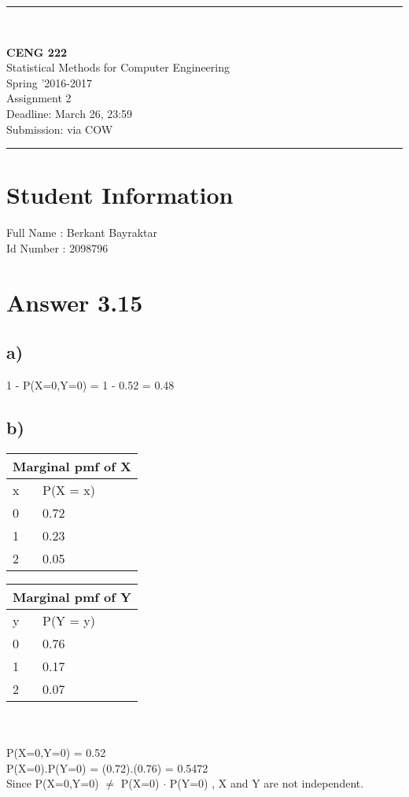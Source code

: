 \documentclass[12pt]{article}
\newcommand{\HRule}{\rule{\linewidth}{1mm}}
\begin{document}
\noindent
\HRule \\[3mm]
\begin{flushright}

                                         \LARGE \textbf{CENG 222}  \\[4mm]
                                         \Large Statistical Methods for Computer Engineering \\[4mm]
                                        \normalsize      Spring '2016-2017 \\
                                           \Large   Assignment 2 \\
					\normalsize Deadline: March 26, 23:59 \\
					\normalsize Submission: via COW
\end{flushright}
\HRule

\section*{Student Information } 
Full Name : Berkant Bayraktar \\
Id Number : 2098796 \\

\section*{Answer 3.15}
\subsection*{a)} 1 - P(X=0,Y=0) = 1 - 0.52 = 0.48 \\
\subsection*{b)} 
\begin{tabular}{| l | l |}
\hline 
\multicolumn{2}{|c|}{Marginal pmf of X}\\
\hline
x & P(X = x)\\
\hline
0 & 0.72\\
\hline
1 & 0.23\\
\hline
2 & 0.05\\
\hline
\end{tabular}
\begin{tabular}{| l | l |}
\hline 
\multicolumn{2}{|c|}{Marginal pmf of Y}\\
\hline
y & P(Y = y)\\
\hline
0 & 0.76\\
\hline
1 & 0.17\\
\hline
2 & 0.07\\
\hline
\end{tabular}
\\\\
P(X=0,Y=0) = 0.52\\
P(X=0).P(Y=0) = (0.72).(0.76) = 0.5472 \\
Since P(X=0,Y=0) $\neq$ P(X=0) $\cdot$ P(Y=0) , X and Y are not independent. \\
\end{document}
